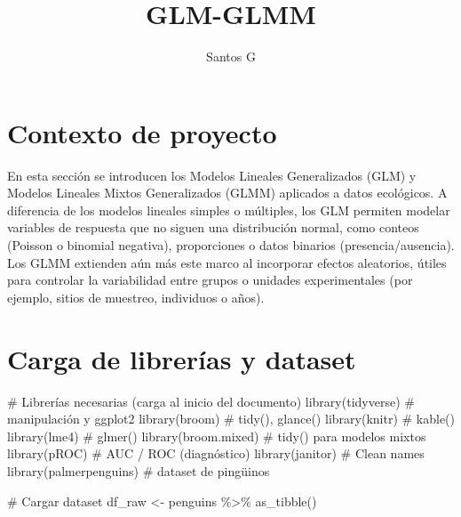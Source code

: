 \documentclass[
  spanish,
  11pt,
  a4paper,
  DIV=11,
  numbers=noendperiod]{scrartcl}
\title{GLM-GLMM}
\author{Santos G}
\date{}
\newenvironment{Shaded}{\begin{snugshade}}{\end{snugshade}}
\newcommand{\CommentTok}[1]{\textcolor[rgb]{0.37,0.37,0.37}{#1}}
\newcommand{\FunctionTok}[1]{\textcolor[rgb]{0.28,0.35,0.67}{#1}}
\newcommand{\NormalTok}[1]{\textcolor[rgb]{0.00,0.23,0.31}{#1}}
\newcommand{\OtherTok}[1]{\textcolor[rgb]{0.00,0.23,0.31}{#1}}
\newcommand{\SpecialCharTok}[1]{\textcolor[rgb]{0.37,0.37,0.37}{#1}}
\renewcommand*\contentsname{Tabla de contenidos}
\newcommand\contentsname{Tabla de contenidos}
\begin{document}
\maketitle

\renewcommand*\contentsname{Tabla de contenidos}
{
\hypersetup{linkcolor=}
\setcounter{tocdepth}{2}
\tableofcontents
}

\section{Contexto de proyecto}\label{contexto-de-proyecto}

En esta sección se introducen los Modelos Lineales Generalizados (GLM) y
Modelos Lineales Mixtos Generalizados (GLMM) aplicados a datos
ecológicos. A diferencia de los modelos lineales simples o múltiples,
los GLM permiten modelar variables de respuesta que no siguen una
distribución normal, como conteos (Poisson o binomial negativa),
proporciones o datos binarios (presencia/ausencia). Los GLMM extienden
aún más este marco al incorporar efectos aleatorios, útiles para
controlar la variabilidad entre grupos o unidades experimentales (por
ejemplo, sitios de muestreo, individuos o años).

\section{Carga de librerías y
dataset}\label{carga-de-libreruxedas-y-dataset}

\begin{Shaded}
\begin{Highlighting}[numbers=left,,]
\CommentTok{\# Librerías necesarias (carga al inicio del documento)}
\FunctionTok{library}\NormalTok{(tidyverse)     }\CommentTok{\# manipulación y ggplot2}
\FunctionTok{library}\NormalTok{(broom)         }\CommentTok{\# tidy(), glance()}
\FunctionTok{library}\NormalTok{(knitr)         }\CommentTok{\# kable()}
\FunctionTok{library}\NormalTok{(lme4)          }\CommentTok{\# glmer()}
\FunctionTok{library}\NormalTok{(broom.mixed)   }\CommentTok{\# tidy() para modelos mixtos}
\FunctionTok{library}\NormalTok{(pROC)          }\CommentTok{\# AUC / ROC (diagnóstico)}
\FunctionTok{library}\NormalTok{(janitor)       }\CommentTok{\# Clean names}
\FunctionTok{library}\NormalTok{(palmerpenguins) }\CommentTok{\# dataset de pingüinos}

\CommentTok{\# Cargar dataset}
\NormalTok{df\_raw }\OtherTok{\textless{}{-}}\NormalTok{ penguins }\SpecialCharTok{\%\textgreater{}\%} \FunctionTok{as\_tibble}\NormalTok{()}
\end{Highlighting}
\end{Shaded}
\end{document}
